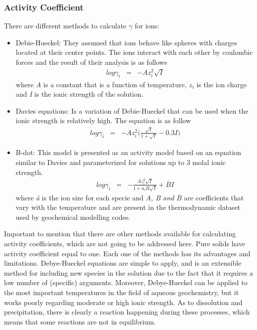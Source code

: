 \subsubsection{Activity Coefficient} \label{actCoeff}
There are different methods to calculate $\gamma$ for ions:
\begin{itemize}
\item Debie-Hueckel: They assumed that ions behave like spheres with charges located at their center points. The ions interact with each other by coulombic forces and the result of their analysis is as follows
\begin{eqnarray} \label{eq:debyeEq}
log \gamma_i &=& - Az_i^2\sqrt{I}
\end{eqnarray} 
where \emph{A} is a constant that is a function of temperature, \emph{$z_i$} is the ion charge and \emph{I} is the ionic strength of the solution.
\item Davies equations: Is a variation of Debie-Hueckel that can be used when the ionic strength is relatively high. The equation is as follow
\begin{eqnarray} \label{eq:daviesEq}
log \gamma_i &=& - Az_i^2 \bigg(\frac{\sqrt{I}}{1+\sqrt{I}} - 0.3 I)
\end{eqnarray}
\item B-dot: This model is presented as an activity model based on an equation similar to Davies and parameterized for solutions up to 3 molal ionic strength.
\begin{eqnarray} \label{eq:bdotEq}
log \gamma_i &=& - \frac{Az_i^2 \sqrt{I}}{1+ a_i B \sqrt{I}} + \overset{.}{B} I 
\end{eqnarray}
where \emph{\aa}  is the ion size for each specie and \emph{A, B and $\overset{.}{B}$} are coefficients that vary with the temperature and are present in the thermodynamic dataset used by geochemical modelling codes.
\end{itemize}
Important to mention that there are other methods available for calculating activity coefficients, which are not going to be addressed here. Pure solids have activity coefficient equal to one. Each one of the methods has its advantages and limitations. Debye-Hueckel equations are simple to apply, and is an extensible method for including new species in the solution due to the fact that it requires a low number of (specific) arguments. Moreover, Debye-Hueckel can be applied to the most important temperatures in the field of aqueous geochemistry, but it works poorly regarding moderate or high ionic strength.
As to dissolution and precipitation, there is clearly a reaction happening during these processes, which means that some reactions are not in equilibrium.

